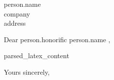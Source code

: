 \documentclass[a4paper, 10pt]{letter}
\makeatletter
\renewcommand{\closing}[1]{\par\nobreak\vspace{\parskip}%
  \stopbreaks
  \noindent
  \ifx\@empty\fromaddress\else
  \hspace*{\longindentation}\fi
  \parbox{\indentedwidth}{\raggedright
       \ignorespaces #1\\[14\medskipamount]%
       \ifx\@empty\fromsig
           \fromname
       \else \fromsig \fi\strut}%
   \par}
\makeatother
\begin{document}
\begin{letter}{
    {{ person.name }}\\
    {{ company }}\\
    {{ address }}
}

\opening{Dear {{ person.honorific }} {{ person.name }},}

{{ parsed_latex_content }}

\closing{Yours sincerely,}

\end{letter}
\end{document}
